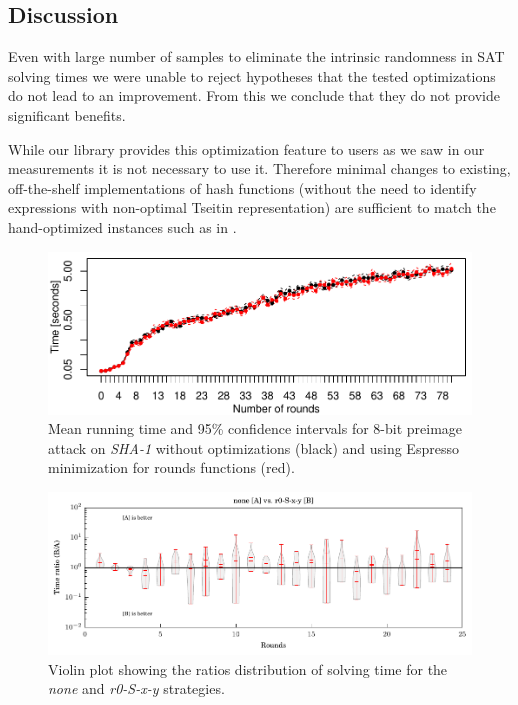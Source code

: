 \subsection{Discussion}
Even with large number of samples to eliminate the intrinsic randomness in SAT solving times we were unable to reject hypotheses that the tested optimizations do not lead to an improvement.
From this we conclude that they do not provide significant benefits.

While our library provides this optimization feature to users as we saw in our measurements it is not necessary to use it.
Therefore minimal changes to existing, off-the-shelf implementations of hash functions (without the need to identify expressions with non-optimal Tseitin representation) are sufficient to match the hand-optimized instances such as in \cite{nossum2012sat}.

\begin{figure}	
\centering \includegraphics{figures/opt-sha1/sha1-32bit-8bitref-cmp-espresso.pdf}
\caption{Mean running time and 95\% confidence intervals for $8$-bit preimage attack on \emph{SHA-1} without optimizations (black) and using Espresso minimization for rounds functions (red).}
\label{fig:opt-sha1-cmp-espresso}
\end{figure}

\begin{figure}
\centering \includegraphics{figures/bo-ex1/ratio-time-none-r0sxy.pdf}
\caption{Violin plot showing the ratios distribution of solving time for the \emph{none} and \emph{r0-S-x-y} strategies.}
\label{fig:bo-ratio-time-none-r0sxy}
\end{figure}

